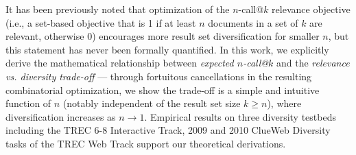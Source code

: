 It has been previously noted that optimization of the $n$-call@$k$
relevance objective (i.e., a set-based objective that is 1 if at least
$n$ documents in a set of $k$ are relevant, otherwise 0) encourages
more result set diversification for smaller $n$, but this statement
has never been formally quantified.  In this work, we explicitly
derive the mathematical relationship between \emph{expected
$n$-call@$k$} and the \emph{relevance vs. diversity trade-off} ---
through fortuitous cancellations in the resulting combinatorial
optimization, we show the trade-off is a simple and intuitive
function of $n$ (notably independent of the result set size $k \geq n$), 
where diversification increases as $n \to 1$. Empirical results on three diversity testbeds including the TREC 6-8 Interactive
Track, 2009 and 2010 ClueWeb Diversity tasks of the TREC Web Track support our theoretical derivations.
